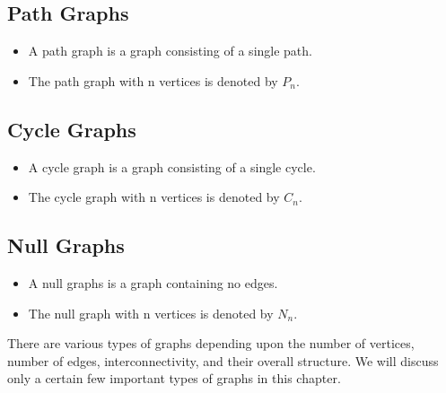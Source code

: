 \documentclass[]{report}
\begin{document}
\subsection{Path Graphs}
\begin{itemize}
\item A path graph is a graph consisting of a single path. 
\item The path graph with n vertices is denoted by $P_n$.
\end{itemize}


\subsection{Cycle Graphs}
\begin{itemize}
\item A cycle graph is a graph consisting of a single cycle. 
\item The cycle graph with n vertices is denoted by $C_n$.
\end{itemize}


\subsection{Null Graphs}
\begin{itemize}
\item A null graphs is a graph containing no edges. \item The null graph with n vertices is denoted by $N_n$.
\end{itemize}



There are various types of graphs depending upon the number of vertices, number of edges, interconnectivity, and their overall structure. We will discuss only a certain few important types of graphs in this chapter.
\end{document}
